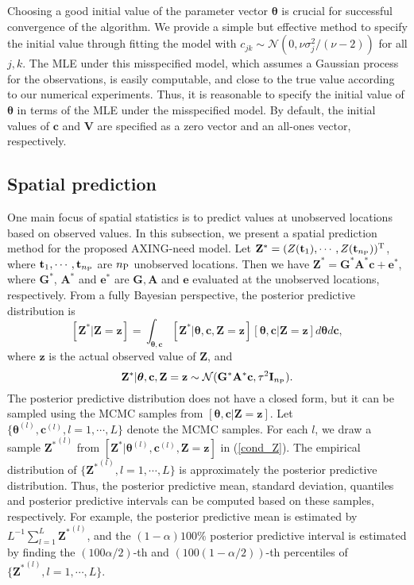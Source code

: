 \documentclass[aoas,preprint]{imsart}
\numberwithin{equation}{section}
\theoremstyle{plain}
\begin{document}
Choosing a good initial value of the parameter vector $\bm{\theta}$ is crucial for successful convergence of the algorithm. We provide a simple but effective method to specify the initial value through fitting the model with $c_{jk} \sim \mathcal{N}(0, \nu\sigma_j^2/(\nu-2))$ for all $j,k$.  The MLE under this misspecified model, which assumes a Gaussian process for the observations, is easily computable, and close to the true value according to our numerical experiments. Thus, it is reasonable to specify the initial value of  $\bm{\theta}$ 
in terms of the MLE under the misspecified model. By default, the initial values of $\mathbf{c}$ and $\mathbf{V}$ are specified as a zero vector and an all-ones vector, respectively.

\subsection{Spatial prediction}\label{bayes_sp}

One main focus of spatial statistics is to predict values at unobserved locations based on observed values. In this subsection, we present a spatial prediction method for the proposed AXING-need model. Let $\mathbf{Z}^*=(Z(\mathbf{t}_1), \cdots, Z(\mathbf{t}_{n_{\rm P}}))^{\rm T}$, where $\mathbf{t}_1,\cdots, \mathbf{t}_{n_{\rm P}}$ are $n_{\rm P}$ unobserved locations. Then we have $\mathbf{Z}^*=\mathbf{G}^*\mathbf{A}^*\mathbf{c}+\mathbf{e}^*$, where $\mathbf{G}^*$, $\mathbf{A}^*$ and $\mathbf{e}^*$ are $\mathbf{G}, \mathbf{A}$ and $\mathbf{e}$ evaluated at the unobserved locations, respectively. From a fully Bayesian perspective, the posterior predictive distribution is
\begin{equation}\label{two_steps}
[\mathbf{Z}^*|\mathbf{Z}=\mathbf{z}]=\int_{\bm{\theta}, \mathbf{c}} [\mathbf{Z}^*|\bm{\theta}, \mathbf{c}, \mathbf{Z}=\mathbf{z}][\bm{\theta}, \mathbf{c}|\mathbf{Z}=\mathbf{z}]d\bm{\theta}d\mathbf{c},
\end{equation}
where $\mathbf{z}$ is the actual observed value of $\mathbf{Z}$, and
\begin{equation}\label{cond_Z}
\mathbf{Z}^*|\bm{\theta}, \mathbf{c}, \mathbf{Z}=\mathbf{z} \sim \mathcal{N}(\mathbf{G}^*\mathbf{A}^*\mathbf{c}, \tau^2 \mathbf{I}_{n_{\rm P}}).
\end{equation}
The posterior predictive distribution does not have a closed form, but it can be sampled using the MCMC samples from $[\bm{\theta}, \mathbf{c}|\mathbf{Z}=\mathbf{z}]$. Let  $\{ \bm{\theta}^{(l)}, \mathbf{c}^{(l)}, l=1,\cdots, L\}$ denote the MCMC samples. For each $l$, we draw a sample ${\mathbf{Z}^*}^{(l)}$ from $[\mathbf{Z}^*|\bm{\theta}^{(l)}, \mathbf{c}^{(l)}, \mathbf{Z}=\mathbf{z}]$ in (\ref{cond_Z}).
The empirical distribution of $\{ {\mathbf{Z}^*}^{(l)}, l=1,\cdots, L\}$ is approximately the posterior predictive distribution.
Thus, the posterior predictive mean, standard deviation, quantiles and posterior predictive intervals can be computed based on these samples, respectively.
For example, the posterior predictive mean is estimated by $L^{-1}\sum_{l=1}^L {\mathbf{Z}^*}^{(l)}$, and the $(1-\alpha)100\%$ posterior predictive interval is estimated by finding the $(100\alpha/2)$-th and $(100(1-\alpha/2))$-th percentiles of $\{ {\mathbf{Z}^*}^{(l)}, l=1,\cdots, L\}$.
\end{document}
